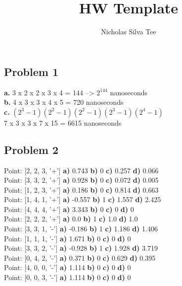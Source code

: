\documentclass[letter]{article}
\title{HW Template}
\author{Nicholas Silva Tee}
\theoremstyle{case}
\begin{document}
\subsection*{Problem 1}
\textbf{a. } 3 x 2 x 2 x 3 x 4 = 144 --> $2^{144}$ nanoseconds\\
\textbf{b. } 4 x 3 x 3 x 4 x 5 = 720 nanoseconds\\
\textbf{c. } $(2^3-1)(2^2-1)(2^2-1)(2^3-1)(2^4-1)$ \\
7 x 3 x 3 x 7 x 15 = 6615 nanoseconds

\subsection*{Problem 2}
Point: [2, 2, 3, '+']    \textbf{a)} 0.743    \textbf{b)} 0     \textbf{c)} 0.257     \textbf{d)} 0.066 \\
Point: [3, 3, 2, '+']    \textbf{a)} 0.928    \textbf{b)} 0     \textbf{c)} 0.072     \textbf{d)} 0.005 \\
Point: [1, 2, 3, '+']    \textbf{a)} 0.186    \textbf{b)} 0     \textbf{c)} 0.814     \textbf{d)} 0.663 \\
Point: [1, 4, 1, '+']    \textbf{a)} -0.557    \textbf{b)} 1     \textbf{c)} 1.557     \textbf{d)} 2.425 \\
Point: [4, 4, 4, '+']    \textbf{a)} 3.343    \textbf{b)} 0     \textbf{c)} 0     \textbf{d)} 0 \\
Point: [2, 2, 2, '+']    \textbf{a)} 0.0    \textbf{b)} 1     \textbf{c)} 1.0     \textbf{d)} 1.0 \\
Point: [3, 3, 1, '-']    \textbf{a)} -0.186    \textbf{b)} 1     \textbf{c)} 1.186     \textbf{d)} 1.406 \\
Point: [1, 1, 1, '-']    \textbf{a)} 1.671    \textbf{b)} 0     \textbf{c)} 0     \textbf{d)} 0 \\
Point: [3, 3, 2, '-']    \textbf{a)} -0.928    \textbf{b)} 1     \textbf{c)} 1.928     \textbf{d)} 3.719 \\
Point: [0, 4, 2, '-']    \textbf{a)} 0.371    \textbf{b)} 0     \textbf{c)} 0.629     \textbf{d)} 0.395 \\
Point: [4, 0, 0, '-']    \textbf{a)} 1.114    \textbf{b)} 0     \textbf{c)} 0     \textbf{d)} 0 \\
Point: [0, 0, 3, '-']    \textbf{a)} 1.114    \textbf{b)} 0     \textbf{c)} 0     \textbf{d)} 0 \\
\newpage
\end{document}
